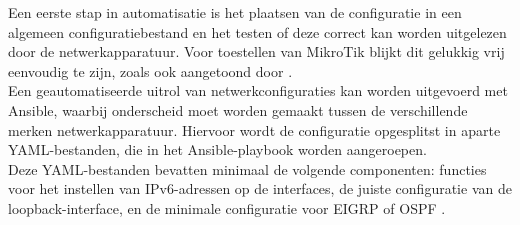   Een eerste stap in automatisatie is het plaatsen van de configuratie in een algemeen configuratiebestand en het testen of deze correct kan worden uitgelezen door de netwerkapparatuur. 
  Voor toestellen van MikroTik blijkt dit gelukkig vrij eenvoudig te zijn, zoals ook aangetoond door \textcite{Arturs2022}.
  \\
  
  Een geautomatiseerde uitrol van netwerkconfiguraties kan worden uitgevoerd met Ansible, waarbij onderscheid moet worden gemaakt tussen de verschillende merken netwerkapparatuur. 
  Hiervoor wordt de configuratie opgesplitst in aparte YAML-bestanden, die in het Ansible-playbook worden aangeroepen.
  \\
  
  Deze YAML-bestanden bevatten minimaal de volgende componenten: functies voor het instellen van IPv6-adressen op de interfaces, de juiste configuratie van de loopback-interface, 
  en de minimale configuratie voor EIGRP of OSPF \autocite{MohdFuziMohdFaris2021}.